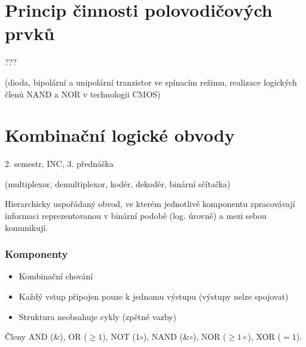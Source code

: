 \documentclass[a4wide]{report}
\begin{document}
\tableofcontents


\chapter{Princip činnosti polovodičových prvků} \label{cha:1}

???

(dioda, bipolární a unipolární tranzistor ve spínacím režimu, realizace logických členů NAND a NOR v technologii CMOS)























\chapter{Kombinační logické obvody} \label{cha:2}

2. semestr, INC, 3. přednáška

(multiplexor, demultiplexor, kodér, dekodér, binární sčítačka)

Hierarchicky uspořádaný obvod, ve kterém jednotlivé komponentu zpracovávají informaci reprezentovanou v binární podobě (log. úrovně) a mezi sebou komunikují.

\subsection{Komponenty}
\begin{itemize}
	\item Kombinační chování
	\item Každý vstup připojen pouze k jednomu výstupu (výstupy nelze spojovat)
	\item Struktura neobsahuje cykly (zpětné vazby)
\end{itemize}

Členy AND (\&), OR ($\geq{}1$), NOT (1$\circ$), NAND (\&$\circ$), NOR ($\geq{}1\circ$), XOR ($=1$).
\end{document}
